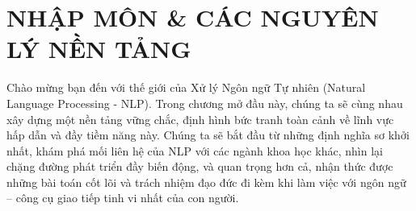 \chapter{NHẬP MÔN \& CÁC NGUYÊN LÝ NỀN TẢNG}
\label{chap:nhap_mon}

Chào mừng bạn đến với thế giới của Xử lý Ngôn ngữ Tự nhiên (Natural Language Processing - NLP). Trong chương mở đầu này, chúng ta sẽ cùng nhau xây dựng một nền tảng vững chắc, định hình bức tranh toàn cảnh về lĩnh vực hấp dẫn và đầy tiềm năng này. Chúng ta sẽ bắt đầu từ những định nghĩa sơ khởi nhất, khám phá mối liên hệ của NLP với các ngành khoa học khác, nhìn lại chặng đường phát triển đầy biến động, và quan trọng hơn cả, nhận thức được những bài toán cốt lõi và trách nhiệm đạo đức đi kèm khi làm việc với ngôn ngữ -- công cụ giao tiếp tinh vi nhất của con người.